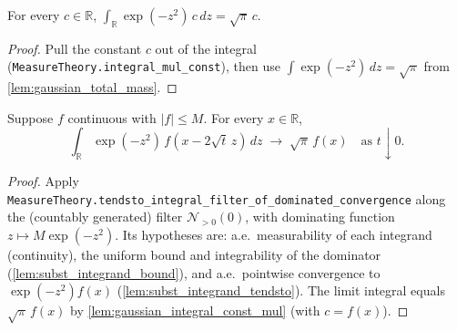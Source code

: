 \begin{lemma}
    \label{lem:gaussian_integral_const_mul}
    \leanok
    For every $c \in \mathbb{R}$, $\int_{\mathbb{R}} \exp(-z^2)\, c\, dz = \sqrt{\pi}\, c$.
\end{lemma}
\begin{proof}
    Pull the constant $c$ out of the integral
    (\texttt{MeasureTheory.integral\_mul\_const}), then use
    $\int \exp(-z^2)\,dz = \sqrt{\pi}$ from \cref{lem:gaussian_total_mass}.
\end{proof}

\begin{lemma}
    \label{lem:subst_integral_tendsto}
    \leanok
    Suppose $f$ continuous with $\lvert f\rvert \le M$. For every $x \in \mathbb{R}$,
    \[ \int_{\mathbb{R}} \exp(-z^2)\, f(x - 2\sqrt{t}\,z)\, dz
       \;\longrightarrow\; \sqrt{\pi}\, f(x) \quad\text{as } t \downarrow 0. \]
\end{lemma}
\begin{proof}
    Apply \texttt{MeasureTheory.tendsto\_integral\_filter\_of\_dominated\_convergence}
    along the (countably generated) filter $\mathcal{N}_{>0}(0)$, with dominating
    function $z \mapsto M\exp(-z^2)$. Its hypotheses are: a.e.\ measurability of each
    integrand (continuity), the uniform bound and integrability of the dominator
    (\cref{lem:subst_integrand_bound}), and a.e.\ pointwise convergence to
    $\exp(-z^2) f(x)$ (\cref{lem:subst_integrand_tendsto}). The limit integral equals
    $\sqrt{\pi}\,f(x)$ by \cref{lem:gaussian_integral_const_mul} (with $c = f(x)$).
\end{proof}

